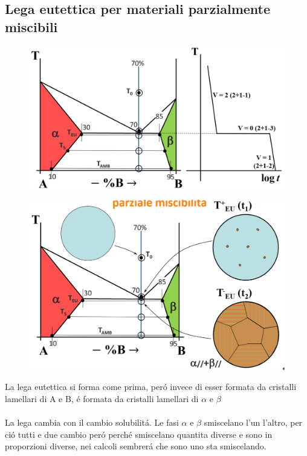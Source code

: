 \documentclass{article}
\begin{document}
{        \subsection{Lega eutettica per materiali parzialmente miscibili}
            \begin{figure}[h!]
                \centering
                \includegraphics[width=.85\linewidth]{Diagramma di stato per lega eutettica tra materiali parzialmente miscibili e traiettoria.png}
            \end{figure}
            \begin{figure}[h!]
                \centering
                \includegraphics[width=.85\linewidth]{Diagramma di stato di parziale solubilita per lega ipoeutettica dopo campo a e cambio di struttura.png}
            \end{figure}
            La lega eutettica si forma come prima, per\'o invece di esser formata da cristalli lamellari di A e B, \'e formata da cristalli lamellari di $\alpha$ e $\beta$ \\ \\
            La lega cambia con il cambio solubilit\'a. Le fasi $\alpha$ e $\beta$ smiscelano l'un l'altro, per ci\'o tutti e due cambio per\'o perch\'e smiscelano quantita diverse e sono in proporzioni diverse, nei calcoli sembrer\'a che sono uno sta smiscelando.
}
\end{document}
